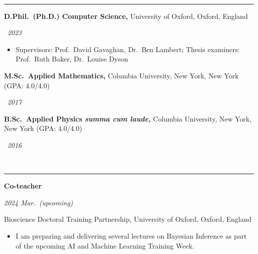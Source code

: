 \documentclass[10pt]{article}
\begin{document}
\vspace{0.6cm}


\vspace{-2.75mm} \\
\rule{\textwidth}{0.4pt}
\vspace{1mm}
\noindent\parbox{.75\textwidth}{\raggedright \textbf{D.Phil.\ (Ph.D.) Computer Science,} University of Oxford, Oxford, England}
\parbox{.25\textwidth}{\raggedleft \emph{~2023}}
\vspace{-.7cm}
\begin{itemize}
\setlength{\itemsep}{0pt}
    \item Supervisors: Prof.\ David Gavaghan, Dr.\ Ben Lambert; Thesis examiners: Prof.\ Ruth Baker, Dr.\ Louise Dyson
\end{itemize}


\vspace{0.1cm}

\noindent\parbox{.9\textwidth}{\raggedright \textbf{M.Sc.\ Applied Mathematics,} Columbia University, New York, New York (GPA: 4.0/4.0)}
\parbox{.1\textwidth}{\raggedleft  \emph{~2017}}


\vspace{0.2cm}

\noindent\parbox{.925\textwidth}{\raggedright \textbf{B.Sc.\ Applied Physics \emph{summa cum laude,}} Columbia University, New York, New York (GPA: 4.0/4.0)}
\parbox{.075\textwidth}{\raggedleft  \emph{~2016}}


\vspace{0.6cm}





\vspace{-2.75mm} \\
\rule{\textwidth}{0.4pt}
\vspace{0.1mm}
\noindent\parbox{.65\textwidth}{\raggedright \textbf{Co-teacher}}
\parbox{.35\textwidth}{\raggedleft \emph{2024 Mar.\ (upcoming)}}
Bioscience Doctoral Training Partnership, University of Oxford, Oxford, England
\vspace{-.2cm}
\begin{itemize}
\setlength{\itemsep}{0pt}
\item I am preparing and delivering several lectures on Bayesian Inference as part of the upcoming AI and Machine Learning Training Week.
\end{itemize}
\end{document}
